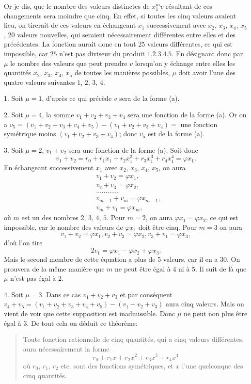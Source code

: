 \documentclass[oneside, 12 pt, leqno]{memoir}
\begin{document}
Or je dis, que le nombre des valeurs distinctes de \(x_1^m v\) résultant de ces changements sera moindre que cinq. En effet, si toutes les cinq valeurs avaient lieu, on tirerait de ces valeurs en échangeant \(x_1\) successivement avec \(x_2\), \(x_3\), \(x_4\), \(x_5\), \(20\) valeurs nouvelles, qui seraient nécessairement différentes entre elles et des précédentes. La fonction aurait donc en tout 25 valeurs différentes, ce qui est impossible, car \(25\) n'est pas diviseur du produit \(1.2.3.4.5\). En désignant donc par \({\mu}\) le nombre des valeurs que peut prendre \(v\) lorsqu'on y échange entre elles les quantités \(x_2\), \(x_3\), \(x_4\), \(x_5\) de toutes les manières possibles, \(\mu\) doit avoir l'une des quatre valeurs suivantes \(1\), \(2\), \(3\), \(4\).

1. Soit \(\mu=1\), d'après ce qui précède \(v\) sera de la forme (a).

2. Soit \(\mu=4\), la somme \(v_1+v_2+v_3+v_4\) sera une fonction de la forme (a). Or on a \(v_5=\left(v_1+v_2+v_3+v_4+v_5\right)-\left(v_1+v_2+v_3+v_4\right)=\) une fonction symétrique moins \(\left(v_1+v_2+v_3+v_4\right)\); donc \(v_5\) est de la forme (a).

3. Soit \(\mu=2\), \(v_1+v_2\) sera une fonction de la forme (a). Soit donc
\[v_1+v_2=r_0+r_1 x_1+r_2 x_1^2+r_3 x_1^3+r_4 x_1^4=\varphi x_1.\]
En échangeant successivement \(x_1\) avec \(x_2\), \(x_3\), \(x_4\), \(x_5\), on aura
\[\begin{aligned}
& v_1+v_2=\varphi x_1, \\
& v_2+v_3=\varphi x_2, \\
& \dots \dots \dots \dots \\
& v_{m-1}+v_m=\varphi x_{m-1}, \\
& v_m+v_1=\varphi x_m,
\end{aligned}\]
où \(m\) est un des nombres \(2\), \(3\), \(4\), \(5\). Pour \(m=2\), on aura \(\varphi x_1=\varphi x_2\), ce qui est impossible, car le nombre des valeurs de \(\varphi x_1\) doit être cinq. Pour \(m=3\) on aura
\[v_1+v_2=\varphi x_1,  v_2+v_3=\varphi x_2,  v_3+v_1=\varphi x_3,\]
d'où l'on tire
\[2 v_1=\varphi x_1-\varphi x_2+\varphi x_3.\]
Mais le second membre de cette équation a plus de 5 valeurs, car il en a 30. On prouvera de la même manière que \(m\) ne peut être égal à 4 ni à 5. Il suit de là que \(\mu\) n'est pas égal à 2.

4. Soit \(\mu=3\). Dans ce cas \(v_1+v_2+v_3\) et par conséquent \(v_4+v_5 = \left(v_1+v_2+v_3+v_4+v_5\right)-\left(v_1+v_2+v_3\right)\) aura cinq valeurs. Mais on vient de voir que cette supposition est inadmissible. Donc \(\mu\) ne peut non plus être égal à 3. De tout cela on déduit ce théorème:
\begin{quote}Toute fonction rationnelle de cinq quantités, qui a cinq valeurs différentes, aura nécessairement la forme
\[r_0+r_1 x+r_2 x^2+r_3 x^3+r_4 x^4\]
où \(r_0\), \(r_1\), \(r_2\) etc. sont des fonctions symétriques, et \(x\) l'une quelconque des cinq quantités.\end{quote}
\end{document}
